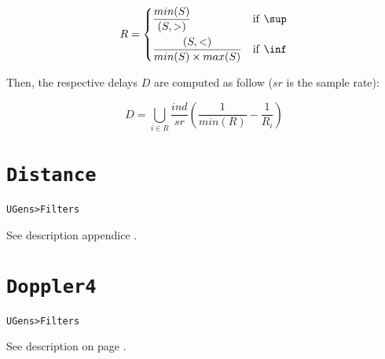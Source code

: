 \[
     R =
\begin{dcases}
	\frac{min(S)}{(S, >)}  & \text{if \texttt{\textbackslash sup}}\\
	\frac{(S, <)}{min(S) \times max(S)}  & \text{if \texttt{\textbackslash inf}} 
   \end{dcases}
\]

Then, the respective delays $D$ are computed as follow ($sr$ is the sample rate):
 
\[
D = \bigcup_{i \in R} \frac{ind}{sr}  \left( \frac{1}{min(R)} - \frac{1}{R_i} \right)
\]

\section{\texttt{Distance}}
\label{ugdist}

\texttt{UGens>Filters}

\bigskip

See description appendice .

\section{\texttt{Doppler4}}
\label{ugdop}

\texttt{UGens>Filters}

\bigskip

See description on page \pageref{dop}.

